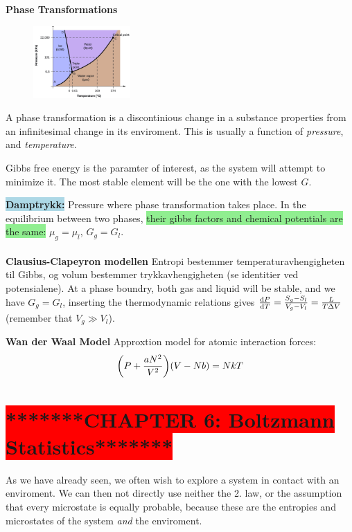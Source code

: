 \documentclass[8pt, a4paper]{extarticle}
\newcommand{\grr}{\colorbox{lightgreen}}
\newcommand{\bll}{\colorbox{lightblue}}
\newcommand{\rdd}{\colorbox{lightred}}
\begin{document}
\begin{twocolumn}
\rdd{\textbf{Phase Transformations}}

\begin{figure}
    \centering
    \includegraphics[width=0.33\textwidth]{figs/fig5.jpg}
\end{figure}

A phase transformation is a discontinious change in a substance properties from an infinitesimal change in its enviroment. This is usually a function of \textit{pressure}, and \textit{temperature}.

Gibbs free energy is the paramter of interest, as the system will attempt to minimize it. The most stable element will be the one with the lowest $G$.

\bll{\textbf{Damptrykk:}} Pressure where phase transformation takes place. In the equilibrium between two phases, \grr{their gibbs factors and chemical potentials are the same:} $\mu_g = \mu_l$, $G_g = G_l$.
\\
\\
\rdd{\textbf{Clausius-Clapeyron modellen}}
Entropi bestemmer temperaturavhengigheten til Gibbs, og volum bestemmer trykkavhengigheten (se identitier ved potensialene). At a phase boundry, both gas and liquid will be stable, and we have $G_g = G_l$, inserting the thermodynamic relations gives
$\dv{P}{T} = \frac{S_g - S_l}{V_g - V_l} = \frac{L}{T\Delta V}$ (remember that $V_g \gg V_l$).


\rdd{\textbf{Wan der Waal Model}}
Approxtion model for atomic interaction forces:
$$
    \qty(P + \frac{aN^2}{V^2})\qty(V - Nb) = NkT
$$



\section*{\colorbox{red}{*******CHAPTER 6: Boltzmann Statistics*******}}
As we have already seen, we often wish to explore a system in contact with an enviroment. We can then not directly use neither the 2. law, or the assumption that every microstate is equally probable, because these are the entropies and microstates of the system \textit{and} the enviroment.


\end{twocolumn}
\end{document}

